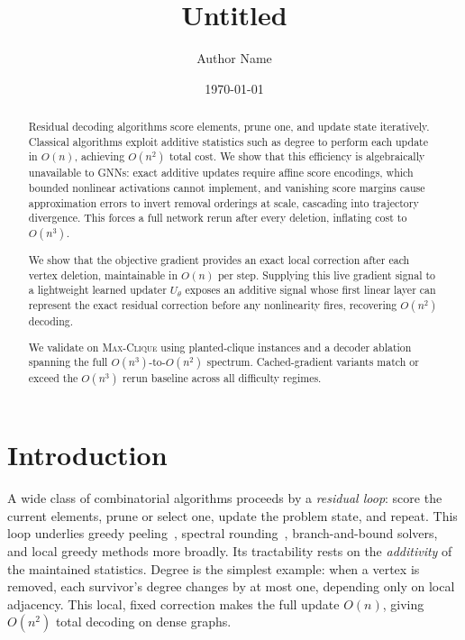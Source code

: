 \documentclass[11pt]{article}
\title{Untitled}
\author{Author Name}
\date{\today}
\theoremstyle{plain}
\theoremstyle{remark}
\begin{document}
\maketitle

\begin{abstract}
  Residual decoding algorithms score elements, prune one, and update state iteratively.
  Classical algorithms exploit additive statistics such as degree to perform each update
  in $O(n)$, achieving $O(n^2)$ total cost. We show that this efficiency is
  algebraically unavailable to GNNs: exact additive updates require affine score
  encodings, which bounded nonlinear activations cannot implement, and vanishing score
  margins cause approximation errors to invert removal orderings at scale, cascading
  into trajectory divergence. This forces a full network rerun after every deletion,
  inflating cost to $O(n^3)$.

  We show that the objective gradient provides an exact local correction after each
  vertex deletion, maintainable in $O(n)$ per step. Supplying this live gradient signal
  to a lightweight learned updater $U_\theta$ exposes an additive signal whose first
  linear layer can represent the exact residual correction before any nonlinearity fires,
  recovering $O(n^2)$ decoding.

  We validate on \textsc{Max-Clique} using planted-clique instances and a decoder
  ablation spanning the full $O(n^3)$-to-$O(n^2)$ spectrum. Cached-gradient variants
  match or exceed the $O(n^3)$ rerun baseline across all difficulty regimes.
\end{abstract}

\section{Introduction}

A wide class of combinatorial algorithms proceeds by a \emph{residual loop}: score
the current elements, prune or select one, update the problem state, and repeat.
This loop underlies greedy peeling~\citep{feige2010}, spectral
rounding~\citep{alon1998}, branch-and-bound solvers, and local greedy methods more
broadly. Its tractability
rests on the \emph{additivity} of the maintained statistics. Degree is the
simplest example: when a vertex is removed, each survivor's degree changes by at
most one, depending only on local adjacency. This local, fixed correction makes the
full update $O(n)$, giving $O(n^2)$ total decoding on dense graphs.
\end{document}
